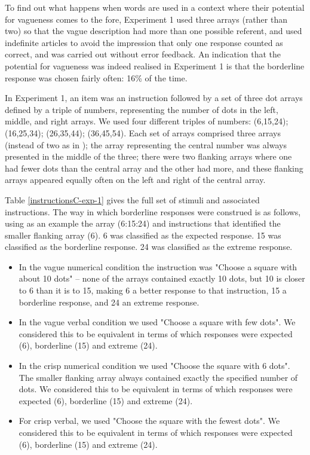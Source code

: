
To find out what happens when words are used in a context where their potential for vagueness comes to the fore, Experiment 1 used three arrays (rather than two) so that the vague description had more than one possible referent, and used indefinite articles to avoid the impression that only one response counted as correct, and was carried out without error feedback. An indication that the potential for vagueness was indeed realised in Experiment 1 is that the borderline response was chosen fairly often: 16\% of the time.

In Experiment 1, an item was an instruction followed by a set of three dot arrays defined by a triple of numbers, representing the number of dots in the left, middle, and right arrays. We used four different triples of numbers: (6,15,24); (16,25,34); (26,35,44); (36,45,54). Each set of arrays comprised three arrays (instead of two as in \citet{green2013utility}); the array representing the central number was always presented in the middle of the three; there were two flanking arrays where one had fewer dots than the central array and the other had more, and these flanking arrays appeared equally often on the left and right of the central array. 

Table \ref{instructionsC-exp-1} gives the full set of stimuli and associated instructions. The way in which borderline responses were construed is as follows, using as an example the array (6:15:24) and instructions that identified the smaller flanking array (6). 6 was classified as the expected response. 15 was classified as the borderline response. 24 was classified as the extreme response. 

\begin{itemize}
	\item In the vague numerical condition the instruction was "Choose a square with about 10 dots" -- none of the arrays contained exactly 10 dots, but 10 is closer to 6 than it is to 15, making 6 a better response to that instruction, 15 a borderline response, and 24 an extreme response. 
	\item In the vague verbal condition we used "Choose a square with few dots". We considered this to be equivalent in terms of which responses were expected (6), borderline (15) and extreme (24).
	\item In the crisp numerical condition we used "Choose the square with 6 dots". The smaller flanking array always contained exactly the specified number of dots. We considered this to be equivalent in terms of which responses were expected (6), borderline (15) and extreme (24).
	\item For crisp verbal, we used "Choose the square with the fewest dots". We considered this to be equivalent in terms of which responses were expected (6), borderline (15) and extreme (24).
\end{itemize}

